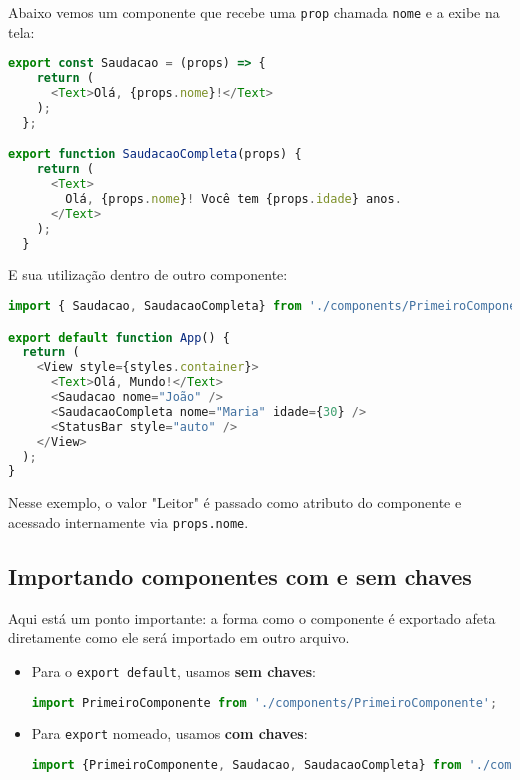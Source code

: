 Abaixo vemos um componente que recebe uma \texttt{prop} chamada \texttt{nome} e a exibe na tela:

\begin{lstlisting}[language=JavaScript, caption={Componente recebendo props}]
export const Saudacao = (props) => {
    return (
      <Text>Olá, {props.nome}!</Text>
    );
  };

export function SaudacaoCompleta(props) {
    return (
      <Text>
        Olá, {props.nome}! Você tem {props.idade} anos.
      </Text>
    );
  }
\end{lstlisting}

E sua utilização dentro de outro componente:

\begin{lstlisting}[language=JavaScript]
import { Saudacao, SaudacaoCompleta} from './components/PrimeiroComponente';

export default function App() {
  return (
    <View style={styles.container}>
      <Text>Olá, Mundo!</Text>
      <Saudacao nome="João" />
      <SaudacaoCompleta nome="Maria" idade={30} />
      <StatusBar style="auto" />
    </View>
  );
}
\end{lstlisting}

Nesse exemplo, o valor "Leitor" é passado como atributo do componente e acessado internamente via \texttt{props.nome}.

\subsection*{Importando componentes com e sem chaves}

Aqui está um ponto importante: a forma como o componente é exportado afeta diretamente como ele será importado em outro arquivo.

\begin{itemize}
  \item Para o \texttt{export default}, usamos \textbf{sem chaves}:
  \begin{lstlisting}[language=JavaScript]
import PrimeiroComponente from './components/PrimeiroComponente';
  \end{lstlisting}

  \item Para \texttt{export} nomeado, usamos \textbf{com chaves}:
  \begin{lstlisting}[language=JavaScript]
import {PrimeiroComponente, Saudacao, SaudacaoCompleta} from './components/PrimeiroComponente';
  \end{lstlisting}
\end{itemize}

